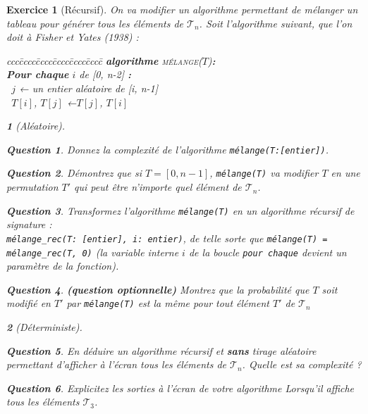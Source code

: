 \documentclass{article}
\theoremstyle{exostyle}
\newtheorem{exo}{Exercice}
\theoremstyle{partiestyle}
\newtheorem{partie}{}[exo]
\theoremstyle{questionstyle}
\newtheorem{questionpartie}{Question}[partie]
\begin{document}
\begin{exo}[Récursif]
    On va modifier un algorithme permettant de mélanger un tableau pour générer tous les éléments de $\mathcal{T}_n$. Soit l'algorithme suivant, que l'on doit à Fisher et Yates (1938) :
        \begin{tabbing}
            ccc\=cccc\=cccc\=cccc\=cccc\=cccc\=\kill
            \textbf{algorithme} \textsc{mélange}($T$){\bf :}\\
            \>\textbf{Pour chaque} $i$ de [0, n-2] {\bf :}\\
            \> \>\vline $\,$ $j$ ← un entier aléatoire de [i, n-1] \\
            \> \>\vline $\,$ $T[i]$, $T[j]$ ←$T[j]$, $T[i]$
        \end{tabbing}

    \begin{partie}[Aléatoire]
        \begin{questionpartie}
            Donnez la complexité de l'algorithme \verb|mélange(T:[entier])|.
        \end{questionpartie}
        \begin{questionpartie}
            Démontrez que si $T=[0, n-1]$, \verb|mélange(T)| va modifier $T$ en une permutation $T'$ qui peut être n'importe quel élément de $\mathcal{T}_n$.
        \end{questionpartie}
        \begin{questionpartie}
            Transformez l'algorithme \verb|mélange(T)| en un algorithme récursif de signature :\\ \verb|mélange_rec(T: [entier], i: entier)|, de telle sorte que \verb|mélange(T) = mélange_rec(T, 0)| (la variable interne $i$ de la boucle \verb|pour chaque| devient un paramètre de la fonction). 
        \end{questionpartie}
        \begin{questionpartie}
        {\em\bf (question optionnelle)} Montrez que la probabilité que $T$ soit modifié en $T'$ par \verb|mélange(T)| est la même pour tout élément $T'$ de $\mathcal{T}_n$
        \end{questionpartie}

        \end{partie}
        \begin{partie}[Déterministe]
        \begin{questionpartie}
            En déduire un algorithme récursif et {\bf sans} tirage aléatoire permettant d'afficher à l'écran tous les éléments de $\mathcal{T}_n$. Quelle est sa complexité ?
        \end{questionpartie}
        \begin{questionpartie}
            Explicitez les sorties à l'écran de votre algorithme Lorsqu'il affiche tous les éléments $\mathcal{T}_3$.
        \end{questionpartie}

    \end{partie}
\end{exo}
\end{document}
